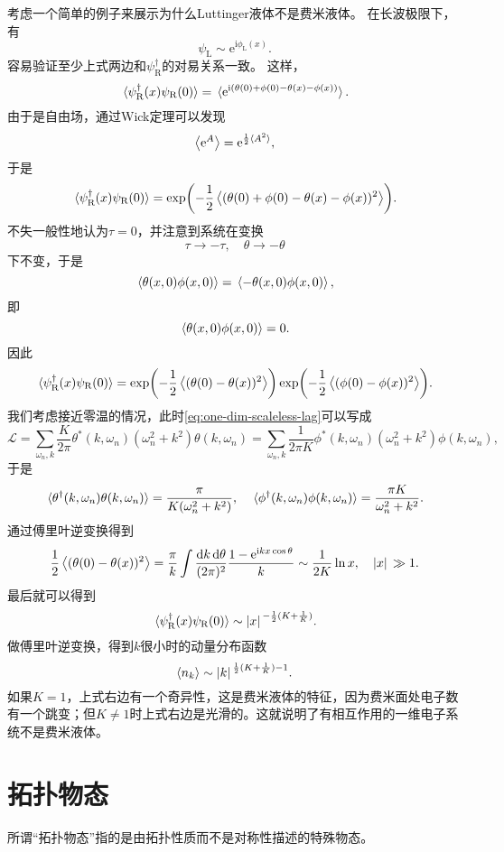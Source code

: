 \documentclass[hyperref, UTF8, a4paper]{ctexart}
\newcommand*{\ii}{\mathrm{i}}
\newcommand*{\ee}{\mathrm{e}}
\begin{document}
考虑一个简单的例子来展示为什么Luttinger液体不是费米液体。
在长波极限下，有
\begin{equation}
    {\psi}_\text{L} \sim \ee^{\ii \phi_\text{L}(x)}.
\end{equation}
容易验证至少上式两边和${\psi}^\dagger_\text{R}$的对易关系一致。
这样，
\[
    \expval*{{\psi}_\text{R}^\dagger(x) {\psi}_\text{R}(0)} = \expval*{\ee^{\ii ({\theta}(0) + {\phi}(0) - {\theta}(x) - {\phi}(x))}}.
\]
由于是自由场，通过Wick定理可以发现
\[
    \expval{\ee^{{A}}} = \ee^{\frac{1}{2} \expval*{{A}^2}},
\]
于是
\[
    \expval*{{\psi}_\text{R}^\dagger(x) {\psi}_\text{R}(0)} = \exp(- \frac{1}{2} \expval{({\theta}(0) + {\phi}(0) - {\theta}(x) - {\phi}(x))^2}).
\]
不失一般性地认为$\tau=0$，并注意到系统在变换
\[
    \tau \longrightarrow - \tau, \quad \theta \longrightarrow -\theta
\]
下不变，于是
\[
    \expval*{{\theta}(x, 0) {\phi}(x, 0)} = \expval*{- {\theta}(x, 0) {\phi}(x, 0)},
\]
即
\[
    \expval*{{\theta}(x, 0) {\phi}(x, 0)} = 0.
\]
因此
\[
    \expval*{{\psi}_\text{R}^\dagger(x) {\psi}_\text{R}(0)} = \exp(- \frac{1}{2} \expval{({\theta}(0) - {\theta}(x))^2}) \exp(- \frac{1}{2} \expval{({\phi}(0) - {\phi}(x))^2}).
\]
我们考虑接近零温的情况，此时\eqref{eq:one-dim-scaleless-lag}可以写成
\[
    \mathcal{L} = \sum_{\omega_n, k} \frac{K}{2\pi} \theta^*(k, \omega_n) (\omega_n^2 + k^2) \theta(k, \omega_n) = \sum_{\omega_n, k} \frac{1}{2\pi K} \phi^*(k, \omega_n) (\omega_n^2 + k^2) \phi(k, \omega_n),
\]
于是
\[
    \expval*{{\theta}^\dagger(k, \omega_n) {\theta}(k, \omega_n)} = \frac{\pi}{K (\omega_n^2 + k^2)}, \quad \expval*{{\phi}^\dagger(k, \omega_n) {\phi}(k, \omega_n)} = \frac{\pi K}{\omega_n^2 + k^2}.
\]
通过傅里叶逆变换得到
\[
    \frac{1}{2} \expval{({\theta}(0) - {\theta}(x))^2} = \frac{\pi}{k} \int \frac{\dd{k} \dd{\theta}}{(2\pi)^2} \frac{1 - \ee^{\ii k x \cos \theta}}{k} \sim \frac{1}{2K} \ln x, \quad \abs*{x} \gg 1.
\]
最后就可以得到
\[
    \expval*{{\psi}_\text{R}^\dagger(x) {\psi}_\text{R}(0)} \sim \abs*{x}^{-\frac{1}{2}(K + \frac{1}{K})}.
\]
做傅里叶逆变换，得到$k$很小时的动量分布函数
\[
    \expval{{n}_k} \sim \abs*{k}^{\frac{1}{2}(K + \frac{1}{K}) - 1}.
\]
如果$K=1$，上式右边有一个奇异性，这是费米液体的特征，因为费米面处电子数有一个跳变；但$K \neq 1$时上式右边是光滑的。这就说明了有相互作用的一维电子系统不是费米液体。

\section{拓扑物态}

所谓“拓扑物态”指的是由拓扑性质而不是对称性描述的特殊物态。
\end{document}
